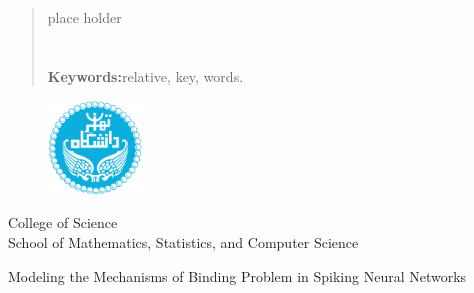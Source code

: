 \documentclass[12pt]{report}
\begin{document}
	
	
	
	\printglossary[title=واژه‌نامه فارسی به انگلیسی, toctitle=واژه‌نامه فارسی به انگلیسی]
	
	
	\begin{latin}
		
		\renewcommand{\bibname}{\rl{{مراجع}\hfill}}
		
	\end{latin}
	
	\linespread{1}
	\begin{latin}
		\begin{abstract}
			place holder
			
			\section*{}
			\textbf{Keywords:}\quad relative, key, words.
		\end{abstract}
		\newpage
		
		\begin{figure}
			\centering
			\includegraphics[height=2.5cm]{ut.png}
		\end{figure}
		\begin{center}
			
			College of Science\\
			School of Mathematics, Statistics, and Computer Science
		\end{center}
		
		\begin{center}
		\end{center}
		
		\begin{center}
			\huge{Modeling the Mechanisms of Binding Problem in Spiking Neural Networks}
		\end{center}
		
		\begin{center}
		\end{center}
		

\end{latin}
\end{document}

